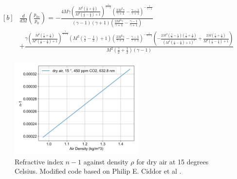 \documentclass{article}
\begin{document}
\begin{equation}
    \begin{aligned}[b]
    & \frac{d}{dM}\left( \frac{p_{0s}}{p_0} \right) = - \frac{4 M \gamma \left(\frac{M^{2} \left(\frac{\gamma}{2} + \frac{1}{2}\right)}{M^{2} \left(\frac{\gamma}{2} - \frac{1}{2}\right) + 1}\right)^{\frac{\gamma}{\gamma - 1}} \left(\frac{2 M^{2} \gamma}{\gamma + 1} - \frac{\gamma - 1}{\gamma + 1}\right)^{- \frac{1}{\gamma - 1}}}{\left(\gamma - 1\right) \left(\gamma + 1\right) \left(\frac{2 M^{2} \gamma}{\gamma + 1} - \frac{\gamma - 1}{\gamma + 1}\right)} \\
    & + \frac{\gamma \left(\frac{M^{2} \left(\frac{\gamma}{2} + \frac{1}{2}\right)}{M^{2} \left(\frac{\gamma}{2} - \frac{1}{2}\right) + 1}\right)^{\frac{\gamma}{\gamma - 1}} \left(M^{2} \left(\frac{\gamma}{2} - \frac{1}{2}\right) + 1\right) \left(\frac{2 M^{2} \gamma}{\gamma + 1} - \frac{\gamma - 1}{\gamma + 1}\right)^{- \frac{1}{\gamma - 1}} \left(- \frac{2 M^{3} \left(\frac{\gamma}{2} - \frac{1}{2}\right) \left(\frac{\gamma}{2} + \frac{1}{2}\right)}{\left(M^{2} \left(\frac{\gamma}{2} - \frac{1}{2}\right) + 1\right)^{2}} + \frac{2 M \left(\frac{\gamma}{2} + \frac{1}{2}\right)}{M^{2} \left(\frac{\gamma}{2} - \frac{1}{2}\right) + 1}\right)}{M^{2} \left(\frac{\gamma}{2} + \frac{1}{2}\right) \left(\gamma - 1\right)}
    \end{aligned}
    \label{eqn:dp0sr_dm}
\end{equation}


\begin{figure}[H]
    \centering
    \includegraphics[width=0.6\textwidth]{dry_air_15_rho_vs_n.png}
    \caption{Refractive index $n-1$ against density $\rho$ for dry air at 15 degrees Celsius. Modified code \cite{refractiveindex.info} based on Philip E. Ciddor et al \cite{Ciddor:96}.}
    \label{fig:refractive_index_vs_density}
\end{figure}
\end{document}
